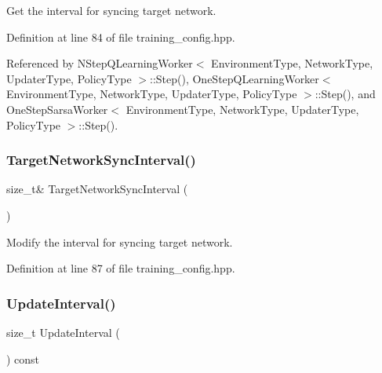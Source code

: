 Get the interval for syncing target network. 



Definition at line 84 of file training\+\_\+config.\+hpp.



Referenced by N\+Step\+Q\+Learning\+Worker$<$ Environment\+Type, Network\+Type, Updater\+Type, Policy\+Type $>$\+::\+Step(), One\+Step\+Q\+Learning\+Worker$<$ Environment\+Type, Network\+Type, Updater\+Type, Policy\+Type $>$\+::\+Step(), and One\+Step\+Sarsa\+Worker$<$ Environment\+Type, Network\+Type, Updater\+Type, Policy\+Type $>$\+::\+Step().

\mbox{\label{classmlpack_1_1rl_1_1TrainingConfig_a44fc92866e2a5ac3c9bbaebac71b8a62}} 
\subsubsection{Target\+Network\+Sync\+Interval()\hspace{0.1cm}{\footnotesize\ttfamily [2/2]}}
{\footnotesize\ttfamily size\+\_\+t\& Target\+Network\+Sync\+Interval (\begin{DoxyParamCaption}{ }\end{DoxyParamCaption})\hspace{0.3cm}{\ttfamily [inline]}}



Modify the interval for syncing target network. 



Definition at line 87 of file training\+\_\+config.\+hpp.

\mbox{\label{classmlpack_1_1rl_1_1TrainingConfig_a3e73fbeca5eb5ab314f65094f59d63b2}} 
\subsubsection{Update\+Interval()\hspace{0.1cm}{\footnotesize\ttfamily [1/2]}}
{\footnotesize\ttfamily size\+\_\+t Update\+Interval (\begin{DoxyParamCaption}{ }\end{DoxyParamCaption}) const\hspace{0.3cm}{\ttfamily [inline]}}



